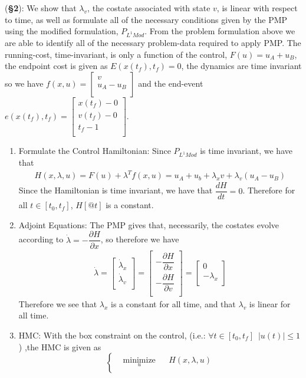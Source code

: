 \documentclass[10pt]{article}
\newcommand{\mat}[2][ccccccccccccccc]{\left [\!\!\begin{array}{#1} #2\\ \end{array} \!\!\right]}
\newcommand{\abs}[1]{ \left|#1\right|}
\newcommand{\libzptrl}[2]{\dfrac{\partial #1}{\partial #2} }
\newcommand{\libz}[2]{\dfrac{d #1}{d #2} }
\begin{document}
\begin{enumerate}[leftmargin=*]
    (\textbf{\S2}): We show that $\lambda_v$, the costate associated with state $v$, is linear with respect to time, as well as formulate all of the necessary conditions given by the PMP using the modified formulation, $P_{L^1Mod}$. From the problem formulation above we are able to identify all of the necessary problem-data required to apply PMP.  The running-cost, time-invariant, is only a function of the control, $F(u)=u_A+u_B$, the endpoint cost is given as $E( x(t_f), t_f)=0$, the dynamics are time invariant so we have $f(x,u)=\mat{v \\ u_A-u_B }$ and the end-event $e(x(t_f),t_f)=\mat{x(t_f)-0\\v(t_f)-0\\t_f-1}$.
    \begin{enumerate}[label=\roman*]
        \item Formulate the Control Hamiltonian:  Since $P_{L^1Mod}$ is time invariant, we have that
              \begin{align*}
                H(x,\lambda, u) = F(u) + \lambda^Tf(x,u) = u_A+u_b+\lambda_x v + \lambda_v(u_A-u_B)
              \end{align*}
              Since the Hamiltonian is time invariant, we have that $\libz{H}{t}=0$.  Therefore for all $t\in[t_0,t_f]$, $H[@t]$ is a constant.
        \item Adjoint Equations: The PMP gives that, necessarily, the costates evolve according to $\dot\lambda = -\libzptrl{H}{x}$, so therefore we have
            \begin{align*}
                \dot\lambda = \mat{\dot\lambda_x \\ \dot\lambda_v }
                            = \mat{-\libzptrl{H}{x} \\[.8em] - \libzptrl{H}{v}}
                            = \mat{0 \\ -\lambda_x}
            \end{align*}
            Therefore we see that $\lambda_x$ is a constant for all time, and that $\lambda_v$ is linear for all time.
        \item HMC:  With the box constraint on the control, (i.e.: $\forall t\in[t_0,t_f]\,\,\, \abs{u(t)}\le1$) ,the HMC is given as
                  \begin{equation}
                  \left\{
                        \begin{aligned}
                            & \underset{u}{\text{minimize}}
                            & & H(x,\lambda,u) \\

\end{aligned}
\end{equation}
\end{enumerate}
\end{enumerate}
\end{document}
